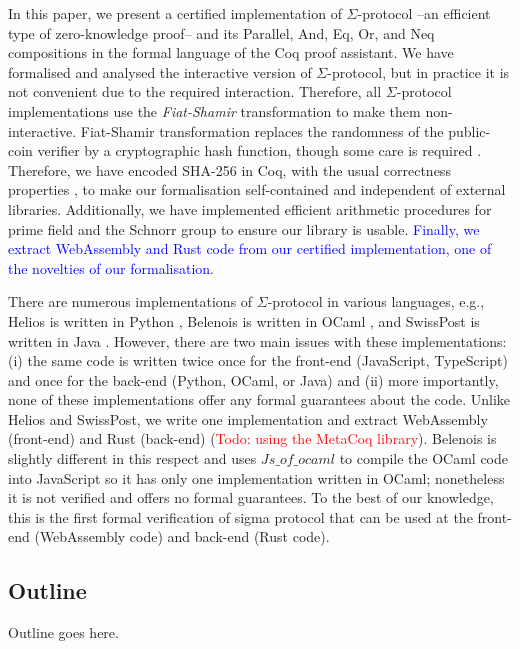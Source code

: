 \documentclass[conference,compsoc]{IEEEtran}
\begin{document}
In this paper, we present a certified implementation of $\Sigma$-protocol --an efficient 
type of zero-knowledge proof-- and its Parallel, And, Eq, Or, and Neq compositions in 
the formal language of the Coq proof assistant. 
We have formalised and analysed the interactive version of 
$\Sigma$-protocol, but in practice it is not convenient due to the required interaction. 
Therefore, all $\Sigma$-protocol implementations use the \textit{Fiat-Shamir} 
transformation \cite{10.5555/36664.36676} to make them non-interactive. 
Fiat-Shamir transformation replaces the randomness of the public-coin verifier by 
a cryptographic hash function, though 
some care is required \cite{10.1007/978-3-642-34961-4_38}.
Therefore, we have encoded SHA-256 in Coq, with the usual correctness properties \cite{nist_fips_180_4},
to make our formalisation self-contained and independent of external libraries. Additionally, we 
have implemented efficient arithmetic procedures for prime field and the Schnorr group to 
ensure our library is usable. \textcolor{blue}{Finally, we extract WebAssembly and 
Rust code from our certified implementation, one of the novelties of our 
formalisation}.


There are numerous implementations of  $\Sigma$-protocol in various languages, 
e.g., Helios is written in Python \cite{helios_crypto}, Belenois is written in OCaml \cite{belenios_core}, 
and SwissPost is written in Java \cite{swisspost_crypto_primitives}.
However, there are two main issues with these implementations: 
(i) the same code is written twice 
once for the front-end (JavaScript, TypeScript) and once for the back-end (Python, OCaml, or Java) and 
 (ii) more importantly, none of these implementations offer any formal guarantees about the code.
Unlike Helios and SwissPost,
we write one implementation and extract WebAssembly (front-end) and Rust (back-end) (\textcolor{red}{Todo: using the MetaCoq library}).
Belenois is slightly different in this respect and uses $Js\_of\_ocaml$ \cite{js_of_ocaml}
to compile the OCaml code into JavaScript so it has only one 
implementation written in OCaml; nonetheless it is not verified 
and offers no formal guarantees. To the best of our knowledge, 
this is the first formal verification of sigma protocol that can be used at 
the front-end (WebAssembly code) and back-end (Rust code). 

\subsection{Outline}
Outline goes here. 
\end{document}
